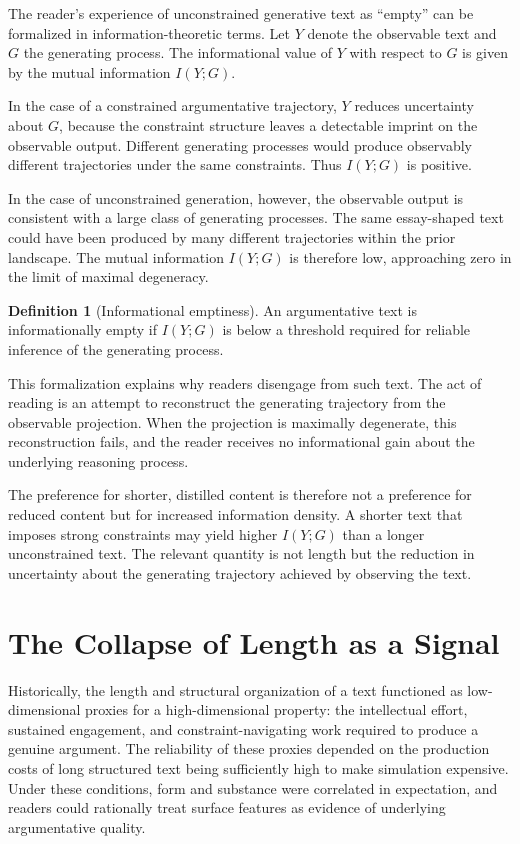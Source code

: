 \documentclass[12pt, oneside]{article}
\theoremstyle{plain}
\theoremstyle{definition}
\newtheorem{definition}[theorem]{Definition}
\theoremstyle{remark}
\begin{document}
The reader's experience of unconstrained generative text as ``empty'' can be formalized in
information-theoretic terms. Let $Y$ denote the observable text and $G$ the generating
process. The informational value of $Y$ with respect to $G$ is given by the mutual information
$I(Y; G)$.

In the case of a constrained argumentative trajectory, $Y$ reduces uncertainty about $G$,
because the constraint structure leaves a detectable imprint on the observable output.
Different generating processes would produce observably different trajectories under the
same constraints. Thus $I(Y; G)$ is positive.

In the case of unconstrained generation, however, the observable output is consistent with
a large class of generating processes. The same essay-shaped text could have been produced
by many different trajectories within the prior landscape. The mutual information
$I(Y; G)$ is therefore low, approaching zero in the limit of maximal degeneracy.

\begin{definition}[Informational emptiness]
An argumentative text is informationally empty if $I(Y; G)$ is below a threshold required
for reliable inference of the generating process.
\end{definition}

This formalization explains why readers disengage from such text. The act of reading is an
attempt to reconstruct the generating trajectory from the observable projection. When the
projection is maximally degenerate, this reconstruction fails, and the reader receives no
informational gain about the underlying reasoning process.

The preference for shorter, distilled content is therefore not a preference for reduced
content but for increased information density. A shorter text that imposes strong
constraints may yield higher $I(Y; G)$ than a longer unconstrained text. The relevant
quantity is not length but the reduction in uncertainty about the generating trajectory
achieved by observing the text.

\section{The Collapse of Length as a Signal}

Historically, the length and structural organization of a text functioned as low-dimensional
proxies for a high-dimensional property: the intellectual effort, sustained engagement, and
constraint-navigating work required to produce a genuine argument. The reliability of these
proxies depended on the production costs of long structured text being sufficiently high to
make simulation expensive. Under these conditions, form and substance were correlated in
expectation, and readers could rationally treat surface features as evidence of underlying
argumentative quality.
\end{document}

